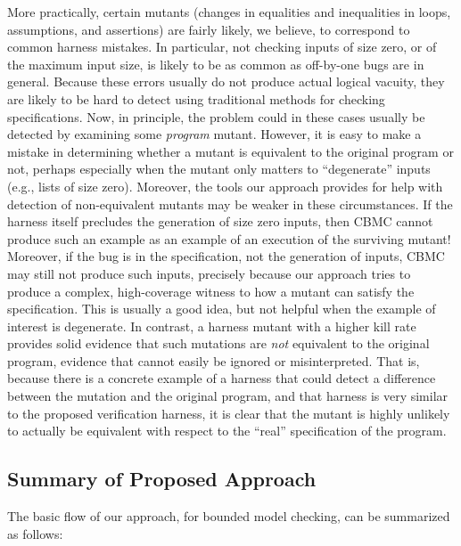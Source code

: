 \documentclass{svjour3}
\begin{document}
More practically, certain mutants (changes in equalities and
inequalities in loops, assumptions, and assertions) are fairly likely,
we believe, to correspond to common harness mistakes.  In particular,
not checking inputs of size zero, or of the maximum input size, is
likely to be as common as off-by-one bugs are in general.  Because these
errors usually do not produce actual logical vacuity, they are likely
to be hard to detect using traditional methods for checking
specifications.  Now, in principle, the problem could in these cases
usually be detected by examining some \emph{program} mutant.  However,
it is easy to make a mistake in determining whether a mutant is
equivalent to the original program or not, perhaps especially when the
mutant only matters to ``degenerate'' inputs (e.g., lists of size zero).  Moreover, the tools our
approach provides for help with detection of non-equivalent mutants
may be weaker in these circumstances.  If the harness itself precludes
the generation of size zero inputs, then CBMC cannot produce such an
example as an example of an execution of the surviving mutant!
Moreover, if the bug is in the specification, not the generation of
inputs, CBMC may still not produce such inputs, precisely because our
approach tries to produce a complex, high-coverage witness to how a
mutant can satisfy the specification.  This is usually a good idea,
but not helpful when the example of interest is degenerate.  In contrast, a harness mutant with a higher kill rate provides solid
evidence that such mutations are \emph{not} equivalent to the original
program, evidence that cannot easily be ignored or misinterpreted.  That
is, because there is a concrete example of a harness that could detect
a difference between the mutation and the original program, and that
harness is very similar to the proposed verification harness, it is
clear that the mutant is highly unlikely to actually be equivalent
with respect to the ``real'' specification of the program.


\subsection{Summary of Proposed Approach}

The basic flow of our approach, for bounded model checking, can be
summarized as follows:
\end{document}
